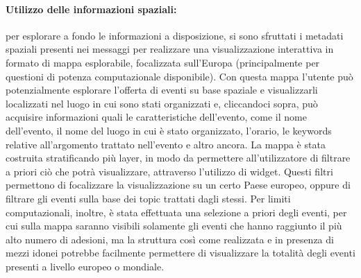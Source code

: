 \documentclass[fleqn,10pt]{SelfArx} %
\begin{document}
{\paragraph{Utilizzo delle informazioni spaziali:}
per esplorare a fondo le informazioni a disposizione, si sono sfruttati i metadati spaziali presenti nei messaggi per realizzare una visualizzazione interattiva in formato di mappa esplorabile, focalizzata sull'Europa (principalmente per questioni di
potenza computazionale disponibile). 
Con questa mappa l'utente può potenzialmente esplorare l'offerta di eventi su base spaziale e visualizzarli localizzati nel luogo in cui sono stati organizzati e, cliccandoci sopra, può acquisire informazioni quali le caratteristiche dell'evento, come il nome dell'evento, il nome del luogo in cui è stato organizzato, l'orario, le keywords relative all'argomento trattato nell'evento e altro ancora. 
La mappa è stata costruita stratificando più layer, in modo da permettere all'utilizzatore di filtrare a priori ciò che potrà visualizzare, attraverso l'utilizzo di widget. 
Questi filtri permettono di focalizzare la visualizzazione su un certo Paese europeo, oppure di filtrare gli eventi sulla base dei topic trattati dagli stessi. 
Per limiti computazionali, inoltre, è stata effettuata una selezione a priori degli eventi, per cui sulla mappa saranno visibili solamente gli eventi che hanno raggiunto il più alto numero di adesioni, ma la struttura così come realizzata e in presenza di mezzi idonei potrebbe facilmente permettere di visualizzare la totalità degli eventi presenti a livello europeo o mondiale.
}
\end{document}
